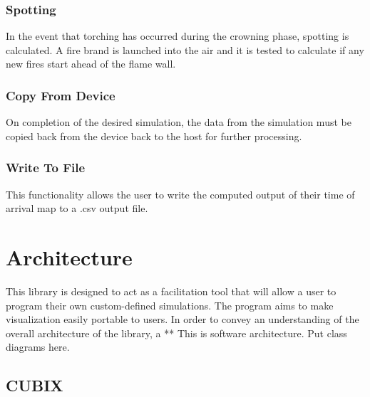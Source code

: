 \subsubsection{Spotting}
In the event that torching has occurred during the crowning phase, spotting is calculated. A fire brand is launched into the air and it is tested to calculate if any new fires start ahead of the flame wall.

\subsubsection{Copy From Device}
On completion of the desired simulation, the data from the simulation must be copied back from the device back to the host for further processing. 

\subsubsection{Write To File}
This functionality allows the user to write the computed output of their time of arrival map to a .csv output file. 

\section{Architecture}
This library is designed to act as a facilitation tool that will allow a user to program their own custom-defined simulations. The program aims to make visualization easily portable to users. In order to convey an understanding of the overall architecture of the library, a 
** This is software architecture. Put class diagrams here. 
\subsection{CUBIX}
